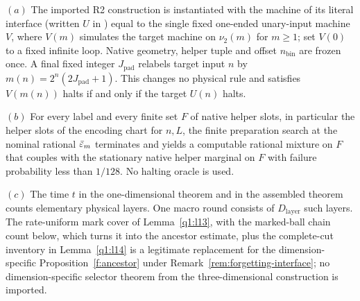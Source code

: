 \begin{lemma}\label{q1:l15}



\((a)\) The imported R2 construction is instantiated with the machine of its literal interface (written \(U\) in \cite{DMNoise1D2026}) equal to the single fixed one-ended unary-input machine \(V\), where \(V(m)\) simulates the target machine on \(\nu_{2}(m)\) for \(m\ge 1\); set \(V(0)\) to a fixed infinite loop. Native geometry, helper tuple and offset \(n_{\mathrm{bin}}\) are frozen once. A final fixed integer \(J_{\mathrm{pad}}\) relabels target input \(n\) by \(m(n)=2^{n}(2J_{\mathrm{pad}}+1)\). This changes no physical rule and satisfies \(V(m(n))\) halts if and only if the target \(U(n)\) halts.

\((b)\) For every label and every finite set \(F\) of native helper slots, in particular the helper slots of the encoding chart for \(n,L\), the finite preparation search at the nominal rational \(\bar{\varepsilon}_{m}\) terminates and yields a computable rational mixture on \(F\) that couples with the stationary native helper marginal on \(F\) with failure probability less than \(1/128\). No halting oracle is used.

\((c)\) The time \(t\) in the one-dimensional theorem and in the assembled theorem counts elementary physical layers. One macro round consists of \(D_{\mathrm{layer}}\) such layers. The rate-uniform mark cover of Lemma~\ref{q1:l13}, with the marked-ball chain count below, which turns it into the ancestor estimate, plus the complete-cut inventory in Lemma~\ref{q1:l14} is a legitimate replacement for the dimension-specific Proposition~\ref{f:ancestor} under Remark~\ref{rem:forgetting-interface}; no dimension-specific selector theorem from the three-dimensional construction is imported.

\end{lemma}
